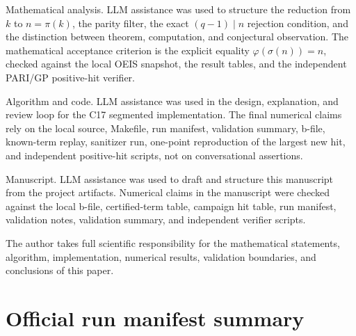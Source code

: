 \documentclass[11pt]{article}
\theoremstyle{definition}
\theoremstyle{remark}
\begin{document}
Mathematical analysis.  LLM assistance was used to structure the reduction from
\(k\) to \(n=\pi(k)\), the parity filter, the exact \((q-1)\mid n\) rejection
condition, and the distinction between theorem, computation, and conjectural
observation.  The mathematical acceptance criterion is the explicit equality
\(\varphi(\sigma(n))=n\), checked against the local OEIS snapshot, the result tables,
and the independent PARI/GP positive-hit verifier.

Algorithm and code.  LLM assistance was used in the design, explanation, and
review loop for the C17 segmented implementation.  The final numerical claims
rely on the local source, Makefile, run manifest, validation summary, b-file,
known-term replay, sanitizer run, one-point reproduction of the largest new
hit, and independent positive-hit scripts, not on conversational assertions.

Manuscript.  LLM assistance was used to draft and structure this manuscript
from the project artifacts.  Numerical claims in the manuscript were checked
against the local b-file, certified-term table, campaign hit table, run
manifest, validation notes, validation summary, and independent verifier
scripts.

The author takes full scientific responsibility for the mathematical
statements, algorithm, implementation, numerical results, validation
boundaries, and conclusions of this paper.

\clearpage

\appendix

\section{Official run manifest summary}
\label{app:runs}
\end{document}
